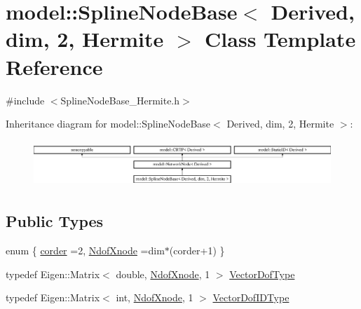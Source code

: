 \hypertarget{classmodel_1_1_spline_node_base_3_01_derived_00_01dim_00_012_00_01_hermite_01_4}{}\section{model\+:\+:Spline\+Node\+Base$<$ Derived, dim, 2, Hermite $>$ Class Template Reference}
\label{classmodel_1_1_spline_node_base_3_01_derived_00_01dim_00_012_00_01_hermite_01_4}


{\ttfamily \#include $<$Spline\+Node\+Base\+\_\+\+Hermite.\+h$>$}

Inheritance diagram for model\+:\+:Spline\+Node\+Base$<$ Derived, dim, 2, Hermite $>$\+:\begin{figure}[H]
\begin{center}
\leavevmode
\includegraphics[height=1.766562cm]{classmodel_1_1_spline_node_base_3_01_derived_00_01dim_00_012_00_01_hermite_01_4}
\end{center}
\end{figure}
\subsection*{Public Types}
\begin{DoxyCompactItemize}
\item 
enum \{ \hyperlink{classmodel_1_1_spline_node_base_3_01_derived_00_01dim_00_012_00_01_hermite_01_4_ae288f8c6f88dca62c53b2164ba603c5ba6d95994a8910c3c6f20734600a871b0f}{corder} =2, 
\hyperlink{classmodel_1_1_spline_node_base_3_01_derived_00_01dim_00_012_00_01_hermite_01_4_ae288f8c6f88dca62c53b2164ba603c5ba78947b7dee14451b2f75b7657f6c0c61}{Ndof\+Xnode} =dim$\ast$(corder+1)
 \}
\item 
typedef Eigen\+::\+Matrix$<$ double, \hyperlink{classmodel_1_1_spline_node_base_3_01_derived_00_01dim_00_012_00_01_hermite_01_4_ae288f8c6f88dca62c53b2164ba603c5ba78947b7dee14451b2f75b7657f6c0c61}{Ndof\+Xnode}, 1 $>$ \hyperlink{classmodel_1_1_spline_node_base_3_01_derived_00_01dim_00_012_00_01_hermite_01_4_ae84e26005498ece8bb33e3fed1a61d55}{Vector\+Dof\+Type}
\item 
typedef Eigen\+::\+Matrix$<$ int, \hyperlink{classmodel_1_1_spline_node_base_3_01_derived_00_01dim_00_012_00_01_hermite_01_4_ae288f8c6f88dca62c53b2164ba603c5ba78947b7dee14451b2f75b7657f6c0c61}{Ndof\+Xnode}, 1 $>$ \hyperlink{classmodel_1_1_spline_node_base_3_01_derived_00_01dim_00_012_00_01_hermite_01_4_ae8bedfd4860470c1c8c1ace633f29c2b}{Vector\+Dof\+I\+D\+Type}
\end{DoxyCompactItemize}
